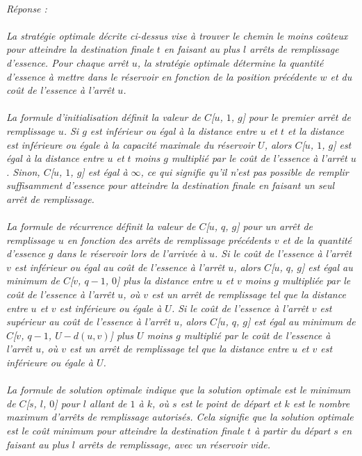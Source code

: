 \documentclass[a4paper,11pt]{article}
\begin{document}
            \\\textit{Réponse : \\\\  
            La stratégie optimale décrite ci-dessus vise à trouver le chemin le moins coûteux pour atteindre la destination finale $t$ en faisant au plus $l$ arrêts de remplissage d'essence. Pour chaque arrêt $u$, la stratégie optimale détermine la quantité d'essence à mettre dans le réservoir en fonction de la position précédente $w$ et du coût de l'essence à l'arrêt $u$.\\\\
La formule d'initialisation définit la valeur de $C$[$u$, $1$, $g$] pour le premier arrêt de remplissage $u$. Si $g$ est inférieur ou égal à la distance entre $u$ et $t$ et la distance est inférieure ou égale à la capacité maximale du réservoir $U$, alors $C$[$u$, $1$, $g$] est égal à la distance entre $u$ et $t$ moins $g$ multiplié par le coût de l'essence à l'arrêt $u$. Sinon, $C$[$u$, $1$, $g$] est égal à $\infty$, ce qui signifie qu'il n'est pas possible de remplir suffisamment d'essence pour atteindre la destination finale en faisant un seul arrêt de remplissage.\\\\
La formule de récurrence définit la valeur de $C$[$u$, $q$, $g$] pour un arrêt de remplissage $u$ en fonction des arrêts de remplissage précédents $v$ et de la quantité d'essence $g$ dans le réservoir lors de l'arrivée à $u$. Si le coût de l'essence à l'arrêt $v$ est inférieur ou égal au coût de l'essence à l'arrêt $u$, alors $C$[$u$, $q$, $g$] est égal au minimum de $C$[$v$, $q-1$, $0$] plus la distance entre $u$ et $v$ moins $g$ multipliée par le coût de l'essence à l'arrêt $u$, où $v$ est un arrêt de remplissage tel que la distance entre $u$ et $v$ est inférieure ou égale à $U$. Si le coût de l'essence à l'arrêt $v$ est supérieur au coût de l'essence à l'arrêt $u$, alors $C$[$u$, $q$, $g$] est égal au minimum de $C$[$v$, $q-1$, $U-d(u,v)$] plus $U$ moins $g$ multiplié par le coût de l'essence à l'arrêt $u$, où $v$ est un arrêt de remplissage tel que la distance entre $u$ et $v$ est inférieure ou égale à $U$.\\\\
La formule de solution optimale indique que la solution optimale est le minimum de $C$[$s$, $l$, $0$] pour $l$ allant de $1$ à $k$, où $s$ est le point de départ et $k$ est le nombre maximum d'arrêts de remplissage autorisés. Cela signifie que la solution optimale est le coût minimum pour atteindre la destination finale $t$ à partir du départ $s$ en faisant au plus $l$ arrêts de remplissage, avec un réservoir vide.   
\\\\}
\end{document}
